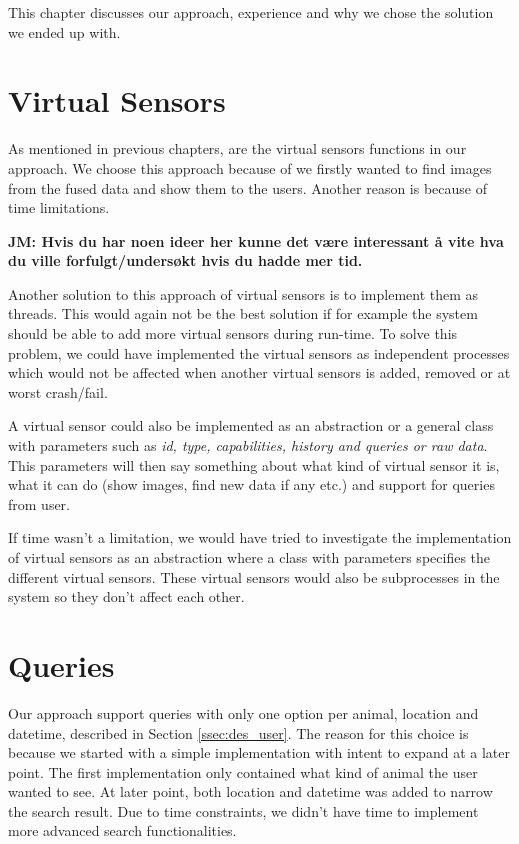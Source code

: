 \documentclass[USenglish]{uit-thesis}
\begin{document}
This chapter discusses our approach, experience and why we chose the solution we ended up with.

\section{Virtual Sensors} \label{sec:disc_vs}
As mentioned in previous chapters, are the virtual sensors functions in our approach. We choose this approach because of we firstly wanted to find images from the fused data and show them to the users. Another reason is because of time limitations.

\textbf{JM: Hvis du har noen ideer her kunne det være interessant å vite hva du ville forfulgt/undersøkt hvis du hadde mer tid.}

Another solution to this approach of virtual sensors is to implement them as threads. This would again not be the best solution if for example the system should be able to add more virtual sensors during run-time. To solve this problem, we could have implemented the virtual sensors as independent processes which would not be affected when another virtual sensors is added, removed or at worst crash/fail. 

A virtual sensor could also be implemented as an abstraction or a general class with parameters such as \textit{id, type, capabilities, history and queries or raw data}. This parameters will then say something about what kind of virtual sensor it is, what it can do (show images, find new data if any etc.) and support for queries from user.

If time wasn't a limitation, we would have tried to investigate the implementation of virtual sensors as an abstraction where a class with parameters specifies the different virtual sensors. These virtual sensors would also be subprocesses in the system so they don't affect each other. 


\section{Queries} \label{sec:disc_query}
Our approach support queries with only one option per animal, location and datetime, described in Section \ref{ssec:des_user}. The reason for this choice is because we started with a simple implementation with intent to expand at a later point. The first implementation only contained what kind of animal the user wanted to see. At later point, both location and datetime was added to narrow the search result. Due to time constraints, we didn't have time to implement more advanced search functionalities.
\end{document}
